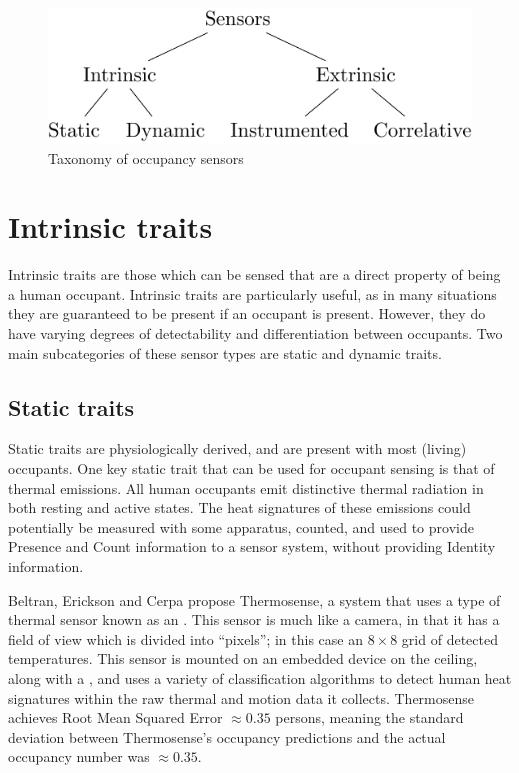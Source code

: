 \documentclass[../thesis/thesis.tex]{subfiles}
\begin{document}
\begin{figure}
\centering
\includegraphics{../diagrams/category-tree.pdf}
\caption{Taxonomy of occupancy sensors}
\label{fig:litreview:taxonomy}
\end{figure}

\section{Intrinsic traits}
\label{subsec:litreview:sensors:intrinsic}

Intrinsic traits are those which can be sensed that are a direct property of being a human occupant. Intrinsic traits are particularly useful, as in many situations they are guaranteed to be present if an occupant is present. However, they do have varying degrees of detectability and differentiation between occupants. Two main subcategories of these sensor types are static and dynamic traits.

\subsection{Static traits}
\label{subsubsec:litreview:sensors:intrinsic:static}
Static traits are physiologically derived, and are present with most (living) occupants. One key static trait that can be used for occupant sensing is that of thermal emissions. All human occupants emit distinctive thermal radiation in both resting and active states. The heat signatures of these emissions could potentially be measured with some apparatus, counted, and used to provide Presence and Count information to a sensor system, without providing Identity information.

Beltran, Erickson and Cerpa \cite{beltran2013thermosense} propose Thermosense, a system that uses a type of thermal sensor known as an \iar. This sensor is much like a camera, in that it has a field of view which is divided into ``pixels''; in this case an $8\times8$ grid of detected temperatures. This sensor is mounted on an embedded device on the ceiling, along with a \pir, and uses a variety of classification algorithms to detect human heat signatures within the raw thermal and motion data it collects. Thermosense achieves Root Mean Squared Error $\approx0.35$ persons, meaning the standard deviation between Thermosense's occupancy predictions and the actual occupancy number was $\approx0.35$.
\end{document}
